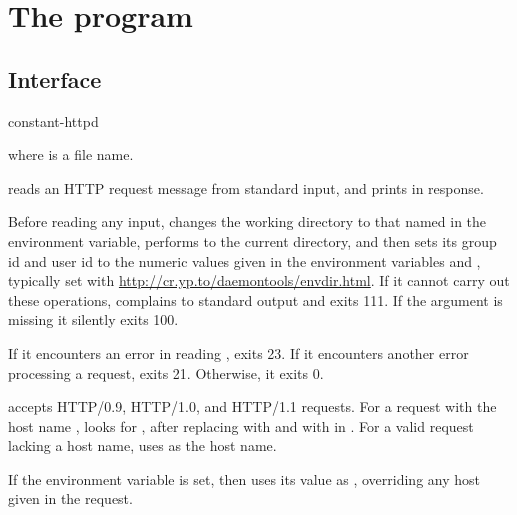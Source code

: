 
\chapter{The  program}

\section{Interface}
\begin{code}
  constant-httpd 
\end{code}
where  is a file name.

 reads an HTTP request message from standard input,
and prints  in response.

Before reading any input,  changes the working
directory to that named in the  environment variable,
performs  to the current directory, and then sets its
group id and user id to the numeric values given in the environment
variables  and , typically set with
\href{\cmd{envdir}}{http://cr.yp.to/daemontools/envdir.html}.
If it cannot carry out these operations, 
complains to standard output and exits 111.  If the 
argument is missing it silently exits 100.

If it encounters an error in reading , 
exits 23.  If it encounters another error processing a request,
 exits 21.  Otherwise, it exits 0.

 accepts HTTP/0.9, HTTP/1.0, and HTTP/1.1
requests.  For a request with the host name ,
 looks for , after
replacing  with \cmd{/:} and \cmd{//} with \cmd{/} in
.  For a valid request lacking a host name,
 uses  as the host name.

If the environment variable  is set, then
 uses its value as , overriding any host given in
the request.

